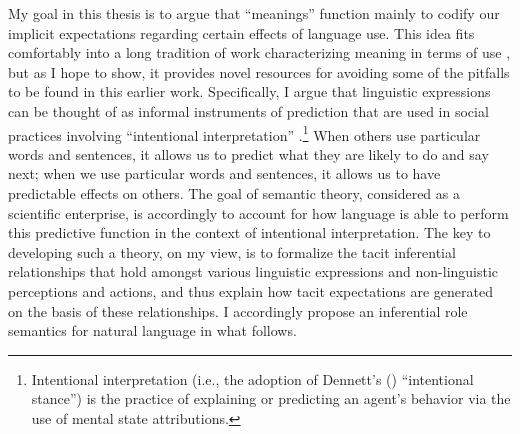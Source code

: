 My goal in this thesis is to argue that ``meanings'' function mainly to codify our implicit expectations regarding certain effects of language use. This idea fits comfortably into a long tradition of work characterizing meaning in terms of use \citep{Sellars:1954,Wittgenstein:1953,Sellars:1953,Harman:1982,Block:1986,Brandom:1994,Brandom:2000,Brandom:2009,Horwich:2005}, but as I hope to show, it provides novel resources for avoiding some of the pitfalls to be found in this earlier work. Specifically, I argue that linguistic expressions can be thought of as informal instruments of prediction that are used in social practices involving ``intentional interpretation'' \citep{Dennett:1987,Brandom:1994}.\footnote{Intentional interpretation (i.e., the adoption of Dennett's (\citeyear{Dennett:1987,Dennett:1991}) ``intentional stance'') is the practice of explaining or predicting an agent’s behavior via the use of mental state attributions.} When others use particular words and sentences, it allows us to predict what they are likely to do and say next; when we use particular words and sentences, it allows us to have predictable effects on others. The goal of semantic theory, considered as a scientific enterprise, is accordingly to account for how language is able to perform this predictive function in the context of intentional interpretation. The key to developing such a theory, on my view, is to formalize the tacit inferential relationships that hold amongst various linguistic expressions and non-linguistic perceptions and actions, and thus explain how tacit expectations are generated on the basis of these relationships. I accordingly propose an inferential role semantics for natural language in what follows. 

